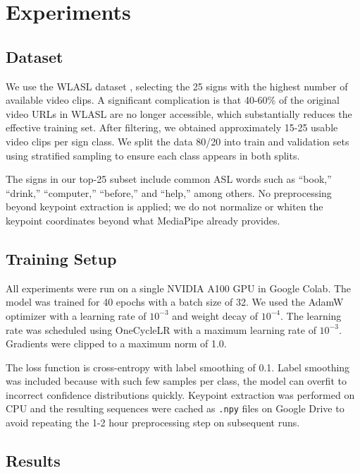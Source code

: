 \documentclass[conference]{IEEEtran}
\begin{document}
\section{Experiments}

\subsection{Dataset}

We use the WLASL dataset \cite{li2020wlasl}, selecting the 25 signs with the highest number of available video clips. A significant complication is that 40-60\% of the original video URLs in WLASL are no longer accessible, which substantially reduces the effective training set. After filtering, we obtained approximately 15-25 usable video clips per sign class. We split the data 80/20 into train and validation sets using stratified sampling to ensure each class appears in both splits.

The signs in our top-25 subset include common ASL words such as ``book,'' ``drink,'' ``computer,'' ``before,'' and ``help,'' among others. No preprocessing beyond keypoint extraction is applied; we do not normalize or whiten the keypoint coordinates beyond what MediaPipe already provides.

\subsection{Training Setup}

All experiments were run on a single NVIDIA A100 GPU in Google Colab. The model was trained for 40 epochs with a batch size of 32. We used the AdamW optimizer \cite{loshchilov2019adamw} with a learning rate of $10^{-3}$ and weight decay of $10^{-4}$. The learning rate was scheduled using OneCycleLR with a maximum learning rate of $10^{-3}$. Gradients were clipped to a maximum norm of 1.0.

The loss function is cross-entropy with label smoothing of 0.1. Label smoothing was included because with such few samples per class, the model can overfit to incorrect confidence distributions quickly. Keypoint extraction was performed on CPU and the resulting sequences were cached as \texttt{.npy} files on Google Drive to avoid repeating the 1-2 hour preprocessing step on subsequent runs.

\subsection{Results}
\end{document}

